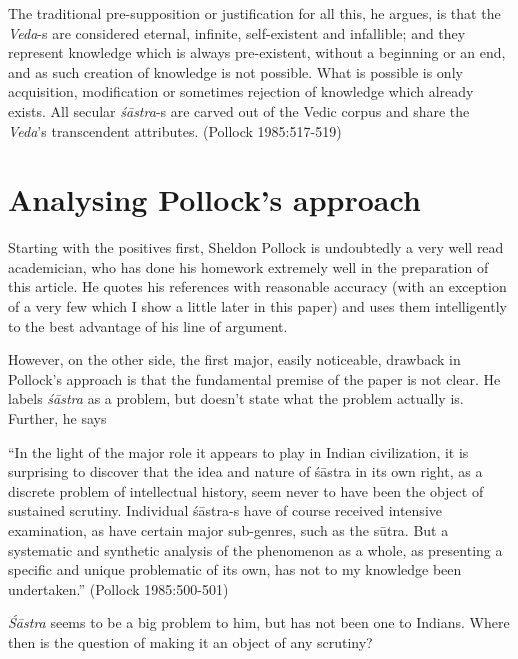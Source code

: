 The traditional pre-supposition or justification for all this, he argues, is that the {\it Veda}-s are considered eternal, infinite, self-existent and infallible; and they represent knowledge which is always pre-existent, without a beginning or an end, and as such creation of knowledge is not possible. What is possible is only acquisition, modification or sometimes rejection of knowledge which already exists. All secular {\it śāstra}-s are carved out of the Vedic corpus and share the {\it Veda}'s transcendent attributes. (Pollock 1985:517-519)

\section*{Analysing Pollock's approach}

Starting with the positives first, Sheldon Pollock is undoubtedly a very well read academician, who has done his homework extremely well in the preparation of this article. He quotes his references with reasonable accuracy (with an exception of a very few which I show a little later in this paper) and uses them intelligently to the best advantage of his line of argument. 

However, on the other side, the first major, easily noticeable, drawback in Pollock's approach is that the fundamental premise of the paper is not clear. He labels {\it śāstra} as a problem, but doesn't state what the problem actually is. Further, he says
\begin{myquote}
``In the light of the major role it appears to play in Indian civilization, it is surprising to discover that the idea and nature of śāstra in its own right, as a discrete problem of intellectual history, seem never to have been the object of sustained scrutiny. Individual śāstra-s have of course received intensive examination, as have certain major sub-genres, such as the sūtra. But a systematic and synthetic analysis of the phenomenon as a whole, as presenting a specific and unique problematic of its own, has not to my knowledge been undertaken.'' (Pollock 1985:500-501)
\end{myquote}

{\it Śāstra} seems to be a big problem to him, but has not been one to Indians. Where then is the question of making it an object of any scrutiny? 

